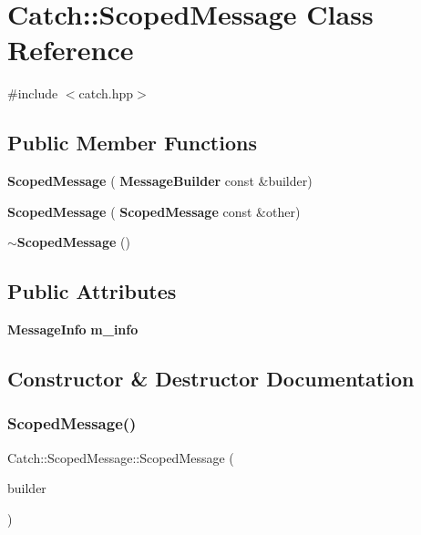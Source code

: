 \section{Catch\+:\+:Scoped\+Message Class Reference}
\label{class_catch_1_1_scoped_message}


{\ttfamily \#include $<$catch.\+hpp$>$}

\subsection*{Public Member Functions}
\begin{DoxyCompactItemize}
\item 
\textbf{ Scoped\+Message} (\textbf{ Message\+Builder} const \&builder)
\item 
\textbf{ Scoped\+Message} (\textbf{ Scoped\+Message} const \&other)
\item 
\textbf{ $\sim$\+Scoped\+Message} ()
\end{DoxyCompactItemize}
\subsection*{Public Attributes}
\begin{DoxyCompactItemize}
\item 
\textbf{ Message\+Info} \textbf{ m\+\_\+info}
\end{DoxyCompactItemize}


\subsection{Constructor \& Destructor Documentation}
\mbox{\label{class_catch_1_1_scoped_message_a5cc59f0f2ebe840e6607f83004d49a17}} 
\subsubsection{Scoped\+Message()\hspace{0.1cm}{\footnotesize\ttfamily [1/2]}}
{\footnotesize\ttfamily Catch\+::\+Scoped\+Message\+::\+Scoped\+Message (\begin{DoxyParamCaption}\item[{\textbf{ Message\+Builder} const \&}]{builder }\end{DoxyParamCaption})}

